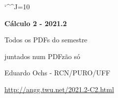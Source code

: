\documentclass[oneside,12pt]{article}
\begin{document}

\def\u#1{\par{\footnotesize \url{#1}}}

\def\drafturl{http://angg.twu.net/LATEX/2021-2-C2.pdf}
\def\drafturl{http://angg.twu.net/2021.2-C2.html}
\def\draftfooter{\tiny \href{\drafturl}{\jobname{}} \ColorBrown{\shorttoday{} \hours}}

\catcode`\^^J=10
\pu



%

\thispagestyle{empty}

\begin{center}

\vspace*{1.2cm}

{\bf \Large Cálculo 2 - 2021.2}

\bsk

Todos os PDFs do semestre

juntados num PDFzão só

\bsk

Eduardo Ochs - RCN/PURO/UFF

\url{http://angg.twu.net/2021.2-C2.html}

\end{center}

\newpage



\end{document}
